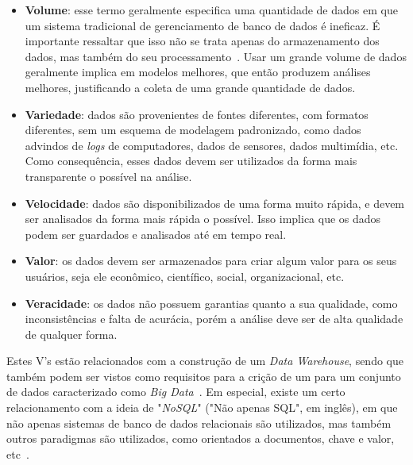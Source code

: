 \begin{itemize}
	\item \textbf{Volume}: esse termo geralmente especifica uma quantidade de dados em que um sistema tradicional de gerenciamento de banco de dados é ineficaz.
É importante ressaltar que isso não se trata apenas do armazenamento dos dados, mas também do seu processamento~\cite{boussoufBigDataBased2018}.
Usar um grande volume de dados geralmente implica em modelos melhores, que então produzem análises melhores, justificando a coleta de uma grande quantidade de dados.
	\item \textbf{Variedade}: dados são provenientes de fontes diferentes, com formatos diferentes, sem um esquema de modelagem padronizado, como dados advindos de \textit{logs} de computadores, dados de sensores, dados multimídia, etc.
Como consequência, esses dados devem ser utilizados da forma mais transparente o possível na análise.
	\item \textbf{Velocidade}: dados são disponibilizados de uma forma muito rápida, e devem ser analisados da forma mais rápida o possível.
Isso implica que os dados podem ser guardados e analisados até em tempo real.
	\item \textbf{Valor}: os dados devem ser armazenados para criar algum valor para os seus usuários, seja ele econômico, científico, social, organizacional, etc.
	\item \textbf{Veracidade}: os dados não possuem garantias quanto a sua qualidade, como inconsistências e falta de acurácia, porém a análise deve ser de alta qualidade de qualquer forma.
\end{itemize}

Estes V's estão relacionados com a construção de um \textit{Data Warehouse}, sendo que também podem ser vistos como requisitos para a crição de um para um conjunto de dados caracterizado como \textit{Big Data}~\cite{zhangBigDataFramework2017}.
Em especial, existe um certo relacionamento com a ideia de "\textit{NoSQL}" ("Não apenas SQL", em inglês), em que não apenas sistemas de banco de dados relacionais são utilizados, mas também outros paradigmas são utilizados, como orientados a documentos, chave e valor, etc~\cite{bimonteOpenIssuesBig2016}.

